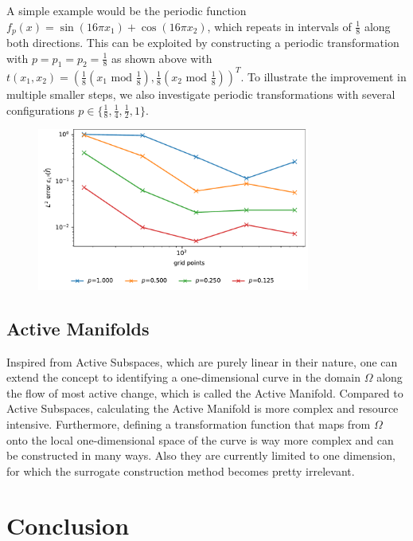 \documentclass[
  a4paper,  %
  twoside,  %
  bibliography=totoc,
  headsepline,
  cleardoublepage=empty,
  parskip=half,
  draft=false
]{scrbook}
\begin{document}
A simple example would be the periodic function $f_p(x)=\sin(16\pi x_1)  + \cos(16\pi x_2)$, which repeats in intervals of $\frac{1}{8}$ along both directions.
This can be exploited by constructing a periodic transformation with $p=p_1=p_2=\frac{1}{8}$ as shown above with $t(x_1,x_2)=(\frac{1}{8} (x_1 \text{ mod } \frac{1}{8}), \frac{1}{8} (x_2 \text{ mod } \frac{1}{8}))^T$.
To illustrate the improvement in multiple smaller steps, we also investigate periodic transformations with several configurations $p \in \{\frac{1}{8}, \frac{1}{4}, \frac{1}{2}, 1\}$.

\begin{figure}[H]
\centering
\includegraphics[width=0.8\textwidth]{graphics/periodic}
\label{fig:periodic}
\end{figure}

\subsection{Active Manifolds}

Inspired from Active Subspaces, which are purely linear in their nature, one can extend the concept to identifying a one-dimensional curve in the domain $\Omega$ along the flow of most active change, which is called the Active Manifold.
Compared to Active Subspaces, calculating the Active Manifold is more complex and resource intensive.
Furthermore, defining a transformation function that maps from $\Omega$ onto the local one-dimensional space of the curve is way more complex and can be constructed in many ways.
Also they are currently limited to one dimension, for which the surrogate construction method becomes pretty irrelevant.

\section{Conclusion}
\end{document}
